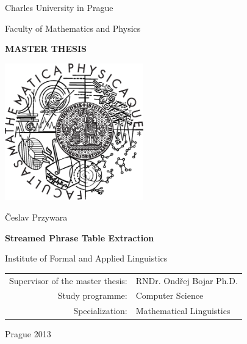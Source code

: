 \documentclass[12pt,a4paper]{report}
\begin{document}


\pagestyle{empty}
\begin{center}

\large

Charles University in Prague

\medskip

Faculty of Mathematics and Physics

\vfill

{\bf\Large MASTER THESIS}

\vfill

\centerline{\mbox{\includegraphics[width=60mm]{logo.eps}}}

\vfill
\vspace{5mm}

{\LARGE Česlav Przywara}

\vspace{15mm}

{\LARGE\bfseries Streamed Phrase Table Extraction}

\vfill

Institute of Formal and Applied Linguistics

\vfill

\begin{tabular}{rl}

Supervisor of the master thesis: & RNDr. Ondřej Bojar Ph.D. \\
\noalign{\vspace{2mm}}
Study programme: & Computer Science \\
\noalign{\vspace{2mm}}
Specialization: & Mathematical Linguistics \\
\end{tabular}

\vfill

Prague 2013

\end{center}
\end{document}
